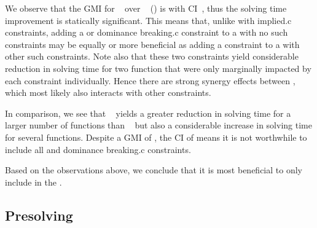 We observe that the \gls{GMI} for ~ over ~
() is \printGMI{%
  \SolvTechEnableOnlyGoodDomConsPrePlusSolvingTimeSpeedupPrePlusSolvingTimeRegularSpeedupGmean%
} with \gls{CI}~\printGMICI{%
  \SolvTechEnableOnlyGoodDomConsPrePlusSolvingTimeSpeedupPrePlusSolvingTimeRegularSpeedupCiMin%
}{%
  \SolvTechEnableOnlyGoodDomConsPrePlusSolvingTimeSpeedupPrePlusSolvingTimeRegularSpeedupCiMax%
}, thus the solving time improvement is statically significant.
%
This means that, unlike with \gls{implied.c} \glspl{constraint}, adding a
 or \gls{dominance breaking.c} \gls{constraint} to
a  with no such \glspl{constraint} may be equally or
more beneficial as adding a \gls{constraint} to a 
with other such \glspl{constraint}.
%
Note also that these two \glspl{constraint} yield considerable reduction in
solving time for two \gls{function} that were only marginally impacted by each
\gls{constraint} individually.
%
Hence there are strong synergy effects between
, which most likely also interacts with other
\glspl{constraint}.

In comparison, we see that ~ yields a greater reduction in solving time
for a larger number of \glspl{function} than ~ but also a considerable increase in
solving time for several \glspl{function}.
%
Despite a \gls{GMI} of \printGMI{%
  \SolvTechDisableAllDomConsPrePlusSolvingTimeSpeedupPrePlusSolvingTimeRegularSpeedupGmean%
}, the \gls{CI} of \printGMICI{%
  \SolvTechDisableAllDomConsPrePlusSolvingTimeSpeedupPrePlusSolvingTimeRegularSpeedupCiMin%
}{%
  \SolvTechDisableAllDomConsPrePlusSolvingTimeSpeedupPrePlusSolvingTimeRegularSpeedupCiMax%
} means it is not worthwhile to include all  and
\gls{dominance breaking.c} \glspl{constraint}.

Based on the observations above, we conclude that it is most beneficial to only
include  in the .


\subsection{Presolving}

